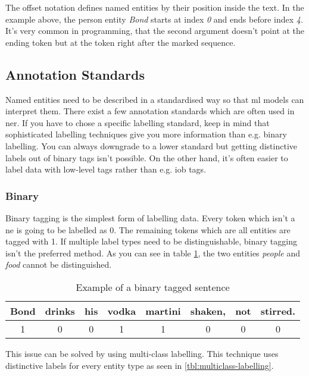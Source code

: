 The offset notation defines named entities by their position inside the text. In the example above, the person entity \emph{Bond} starts at index \emph{0} and ends before index \emph{4}. It's very common in programming, that the second argument doesn't point at the ending token but at the token right after the marked sequence.

\subsection{Annotation Standards}

Named entities need to be described in a standardised way so that \acrshort{ml} models can interpret them. There exist a few annotation standards which are often used in \acrshort{ner}. If you have to chose a specific labelling standard, keep in mind that sophisticated labelling techniques give you more information than e.g. binary labelling. You can always downgrade to a lower standard but getting distinctive labels out of binary tags isn't possible. On the other hand, it's often easier to label data with low-level tags rather than e.g. \acrshort{iob} tags.

\subsubsection{Binary}

Binary tagging is the simplest form of labelling data. Every token which isn't a \acrlong{ne} is going to be labelled as 0. The remaining tokens which are all entities are tagged with 1. If multiple label types need to be distinguishable, binary tagging isn't the preferred method. As you can see in table \ref{tbl:binary-labelling}, the two entities \emph{people} and \emph{food} cannot be distinguished.

\begin{table}[h!]
    \centering
    \begin{tabular}{|c|c|c|c|c|c|c|c|}
        \hline
        Bond & drinks & his & vodka & martini & shaken, & not & stirred. \\
        \hline
        1 & 0 & 0 & 1 & 1 & 0 & 0 & 0 \\
        \hline
    \end{tabular}
    \caption{Example of a binary tagged sentence}
    \label{tbl:binary-labelling}
\end{table}

This issue can be solved by using multi-class labelling. This technique uses distinctive labels for every entity type as seen in \ref{tbl:multiclass-labelling}.

